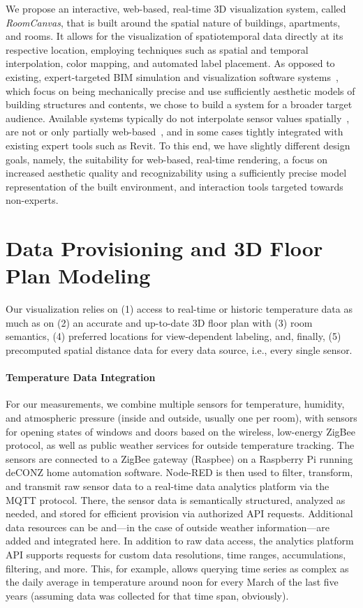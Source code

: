\documentclass{egpubl}
\begin{document}
We propose 
an interactive, web-based, real-time 3D 
visualization system, called \emph{RoomCanvas}, that is built around the spatial nature of buildings, apartments, and rooms. It allows for the visualization of spatiotemporal data directly at its respective location, employing techniques such as spatial and temporal interpolation, color mapping, and automated label placement. 
As opposed to existing, expert-targeted BIM simulation and visualization software systems~\cite{chang2018-automated}, which focus on being mechanically precise and use sufficiently aesthetic models of building structures and contents, we chose to build a system for a broader target audience.
Available systems typically do not interpolate sensor values spatially~\cite{delgado2018-structural,mccaffrey2015-development}, are not or only partially web-based~\cite{mccaffrey2015-development}, and in some cases tightly integrated with existing expert tools such as Revit.
To this end, we have slightly different design goals, namely, the suitability for web-based, real-time rendering, a focus on increased aesthetic quality and recognizability using a sufficiently precise model representation of the built environment, and interaction tools targeted towards non-experts.

\section{Data Provisioning and 3D Floor Plan Modeling}%
\label{sec:Data Processing and Provisioning}

Our visualization relies on (1) access to real-time or historic temperature data as much as on (2) an accurate and up-to-date 3D floor plan with (3) room semantics, (4) preferred locations for view-dependent labeling, and, finally, (5) precomputed spatial distance data for every data source, i.e., every single sensor.

\paragraph*{Temperature Data Integration}
For our measurements, we combine multiple sensors for temperature, humidity, and atmospheric pressure (inside and outside, usually one per room), with sensors for opening states of windows and doors based on the wireless, low-energy ZigBee protocol, as well as public weather services for outside temperature tracking.
The sensors are connected to a ZigBee gateway (Raspbee) on a Raspberry Pi %
 running deCONZ home automation software.
Node-RED is then used to filter, transform, and transmit raw sensor data to a real-time data analytics platform via the MQTT protocol. %
There, the sensor data is semantically structured, analyzed as needed, and stored for efficient provision via authorized API requests.
Additional data resources can be and---in the case of outside weather information---are added and integrated here.
In addition to raw data access, the analytics platform API supports requests for custom data resolutions, time ranges, accumulations, filtering, and more. 
This, for example, allows querying time series as complex as the daily average in temperature around noon for every March of the last five years (assuming data was collected for that time span, obviously).%
\end{document}
